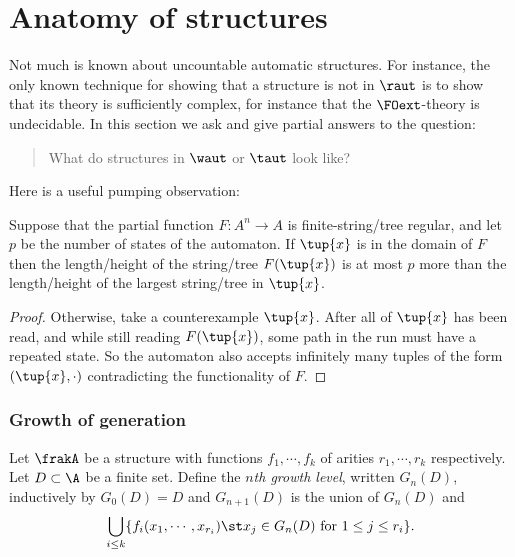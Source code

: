 \section{Anatomy of structures}



Not much is known about uncountable automatic structures. For instance, the only known technique for showing that a structure
is not in $\raut$ is to show that its theory is sufficiently complex, for instance that the $\FOext$-theory is undecidable.
In this section we ask and give partial answers to the question:
\begin{quote}
What do structures in $\waut$ or $\taut$ look like?
\end{quote}
Here is a useful pumping observation:



\begin{proposition} \label{AS:prop:locfin} \cite{KhNe95}
Suppose that the partial function $F:A^n \to A$ is finite-string/tree regular, and let $p$ be the number of states of the automaton.
If $\tup{x}$ is in the domain of $F$ then the length/height of the string/tree $F(\tup{x})$ is at most $p$ more than the length/height of the largest string/tree in $\tup{x}$.
\end{proposition}

\begin{proof}
Otherwise, take a counterexample  $\tup{x}$.
After all of $\tup{x}$ has been read, and while still reading $F(\tup{x})$, some path in the run must have a repeated state. 
So the automaton also accepts infinitely many tuples of the form $(\tup{x}, \cdot)$ contradicting the functionality of $F$.
\end{proof}

\subsubsection*{Growth of generation}

\begin{definition} \label{dfn:growth} \cite{KhNe95}
Let $\frakA$ be a structure with functions $f_1, \cdots, f_k$ of arities $r_1, \cdots, r_k$ respectively. 
Let $D \subset \A$ be a finite set.
Define the
{\em $n$th growth level}, written $G_n(D)$, inductively by $G_0(D) = D$
and $G_{n+1}(D)$ is the union of $G_n(D)$ and
\[
\bigcup_{i\leq k} \{f_i(x_1,\cdots,x_{r_i}) \st x_j \in G_n(D) \text{ for } 1 \leq j \leq r_i\}.
\]
\end{definition}


